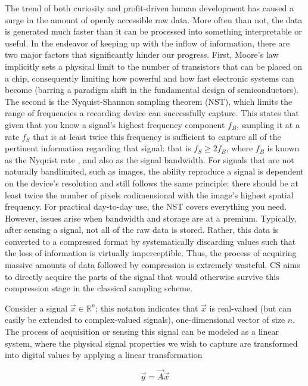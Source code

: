 The trend of both curiosity and profit-driven human development has caused a
surge in the amount of openly accessible raw data. More often than not, the data is generated much faster than it can be processed into something interpretable or useful. In the endeavor of keeping up with the inflow of information, there are two major factors that significantly hinder our progress. First, Moore’s law implicitly sets a physical limit to the number of transistors that can be placed on a chip, consequently limiting how powerful and how fast electronic systems can become (barring a paradigm shift in the fundamental design of semiconductors). The second is the Nyquist-Shannon sampling theorem (NST), which limits the range of frequencies a recording device can successfully capture. This states that given that you know a signal's highest frequency component $f_B$, sampling it at a rate $f_S$ that is at least twice this frequency is sufficient to capture all of the pertinent information regarding that signal: that is $f_S \geq 2f_B$, where $f_B$ is known as the Nyquist rate \cite{Shannon1949}, and also as the signal bandwidth. For signals that are not naturally bandlimited, such as images, the ability reproduce a signal is dependent on the device's resolution and still follows the same principle: there should be at least twice the number of pixels codimensional with the image's highest spatial frequency. For practical day-to-day use, the NST covers everything you need. However, issues arise when bandwidth and storage are at a premium. Typically, after sensing a signal, not all of the raw data is stored. Rather, this data is converted to a compressed format by systematically discarding values such that the loss of information is virtually imperceptible. Thus, the process of acquiring massive amounts of data followed by compression is extremely wasteful. CS aims to directly acquire the parts of the signal that would otherwise survive this compression stage in the classical sampling scheme.

Consider a signal $\vec{x} \in \mathbb{R}^{n}$; this notaton indicates that $\vec{x}$ is real-valued (but can easily be extended to complex-valued signals), one-dimensional vector of size $n$. The process of acquisition or sensing this signal can be modeled as a linear system, where the physical signal properties we wish to capture are transformed into digital values by applying a linear transformation

\begin{equation}\label{eq:cesa-linear}
	\vec{y} = \vec{A} \vec{x}
\end{equation}

